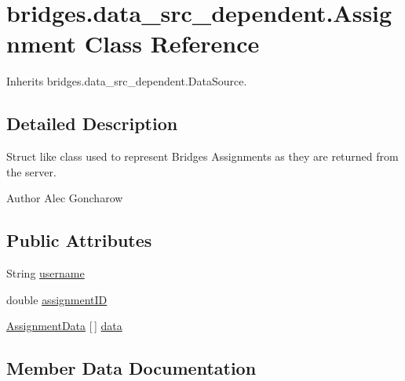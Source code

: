 \hypertarget{classbridges_1_1data__src__dependent_1_1_assignment}{}\section{bridges.\+data\+\_\+src\+\_\+dependent.\+Assignment Class Reference}
\label{classbridges_1_1data__src__dependent_1_1_assignment}


Inherits bridges.\+data\+\_\+src\+\_\+dependent.\+Data\+Source.



\subsection{Detailed Description}
Struct like class used to represent Bridges Assignments as they are returned from the server. 

\begin{DoxyAuthor}{Author}
Alec Goncharow 
\end{DoxyAuthor}
\subsection*{Public Attributes}
\begin{DoxyCompactItemize}
\item 
String \hyperlink{classbridges_1_1data__src__dependent_1_1_assignment_aa7326ba8e0eb02fff4e5b22e4b89e61d}{username}
\item 
double \hyperlink{classbridges_1_1data__src__dependent_1_1_assignment_a88c98da9e5ba6f8d83326d6fbae659d8}{assignment\+ID}
\item 
\hyperlink{classbridges_1_1data__src__dependent_1_1_assignment_data}{Assignment\+Data} \mbox{[}$\,$\mbox{]} \hyperlink{classbridges_1_1data__src__dependent_1_1_assignment_a23d503c5e6eae939bb8262dc8e18c259}{data}
\end{DoxyCompactItemize}


\subsection{Member Data Documentation}
\mbox{\label{classbridges_1_1data__src__dependent_1_1_assignment_a88c98da9e5ba6f8d83326d6fbae659d8}} 
